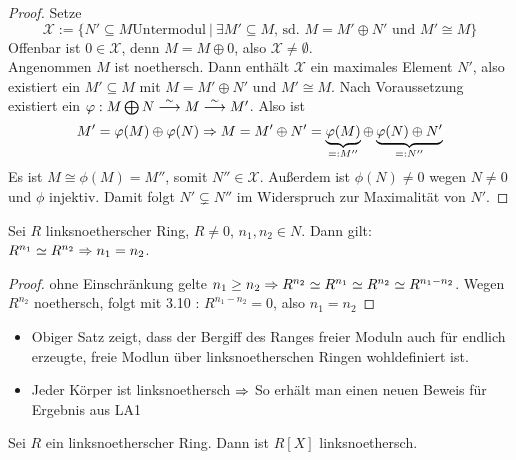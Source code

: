 \begin{proof} 
	Setze $$\mathcal{X} := \{N' \subseteq M \text{Untermodul} \ | \ \exists M' \subseteq M,\, \text{sd. }  M = M' \oplus N'\text{ und } M' \cong M\}$$
	Offenbar ist $0\in \mathcal{X}$, denn $M= M \oplus 0$, also $\mathcal{X} \neq \emptyset$. \\
	Angenommen $M$ ist noethersch. Dann enthält $\mathcal{X}$ ein maximales Element $N'$, also  existiert ein $M' \subseteq M$ mit $M = M' \oplus N'$ und $M' \cong M$. Nach Voraussetzung existiert ein $\varphi : M \bigoplus N \overset{\sim}{\longrightarrow} M \overset{\sim}{\longrightarrow} M'$. Also ist 
	$$M' = \varphi(M) \oplus \varphi(N) \Rightarrow M = M' \oplus N' = \underbrace{\varphi(M)}_{=:M''} \oplus \underbrace{\varphi(N) \oplus N'}_{=:N''} $$ Es ist $M \cong \phi(M) = M''$, somit $ N'' \in \mathcal{X}$. Außerdem ist $\phi(N) \neq 0 $ wegen $ N \neq 0 $ und $\phi$ injektiv. Damit folgt $N' \subsetneq N'' $ im Widerspruch zur Maximalität von $N'$.
\end{proof}
\begin{sa}\label{sa3.11}
	Sei $R$ linksnoetherscher Ring, $R \neq 0$, $n_1,n_2 \in N$. Dann gilt: $ R^{n_1} \simeq R^{n_2} \Rightarrow n_1 = n_2 $.
\end{sa}
\begin{proof}
	ohne Einschränkung gelte $n_1 \geq n_2  \Rightarrow R^{n_2} \simeq R^{n_1} \simeq R^{n_2} \simeq R^{n_1 - n_2} $. Wegen $R^{n_2}$ noethersch, folgt mit 3.10 : $R^{n_1 - n_2} =0$, also $ n_1=n_2$
\end{proof}
\begin{anm}
	\begin{itemize}
		\item Obiger Satz zeigt, dass der Bergiff des Ranges freier Moduln auch für endlich erzeugte, freie Modlun über linksnoetherschen Ringen wohldefiniert ist. 
		\item Jeder Körper ist linksnoethersch $\Rightarrow$ So erhält man einen neuen Beweis für Ergebnis aus LA1
	\end{itemize}
\end{anm}
\begin{sa}\label{sa3.12}
	Sei $R$ ein linksnoetherscher Ring. Dann ist $R[X]$ linksnoethersch.
\end{sa}
